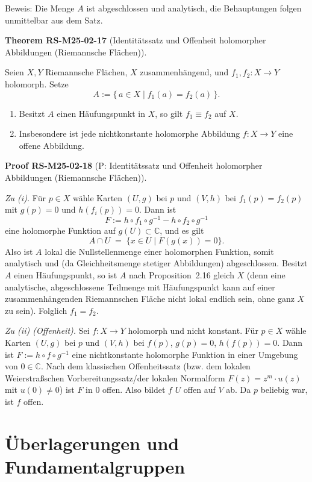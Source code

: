 \documentclass[10pt, letterpaper]{article}
\newcommand{\C}{\mathbb{C}}
\newcommand{\CustomHeading}[3]{%
  \par\medskip\noindent%
  \textbf{#1 #2} \textnormal{(#3)}.\enskip%
}
\newenvironment{THEO}[2]{\begin{unitbox}\CustomHeading{Theorem}{#1}{#2}}{\end{unitbox}}
\newenvironment{PROOF}[2]{\begin{unitbox}\CustomHeading{Proof}{#1}{#2}}{\end{unitbox}}
\begin{document}
Beweis: Die Menge $A$ ist abgeschlossen und analytisch, die Behauptungen folgen unmittelbar aus dem Satz.



\begin{THEO}{RS-M25-02-17}{Identitätssatz und Offenheit holomorpher Abbildungen (Riemannsche Flächen)}
Seien $X,Y$ Riemannsche Flächen, $X$ zusammenhängend, und $f_1,f_2:X\to Y$ holomorph. Setze
\[
A:=\{\,a\in X \mid f_1(a)=f_2(a)\,\}.
\]
\begin{enumerate}
\item[(i)] Besitzt $A$ einen Häufungspunkt in $X$, so gilt $f_1\equiv f_2$ auf $X$.
\item[(ii)] Insbesondere ist jede nichtkonstante holomorphe Abbildung $f:X\to Y$ eine offene Abbildung.
\end{enumerate}
\end{THEO}

\begin{PROOF}{RS-M25-02-18}{P: Identitätssatz und Offenheit holomorpher Abbildungen (Riemannsche Flächen)}
\emph{Zu (i).} Für $p\in X$ wähle Karten $(U,g)$ bei $p$ und $(V,h)$ bei $f_1(p)=f_2(p)$ mit $g(p)=0$ und $h(f_i(p))=0$. Dann ist
\[
F:=h\circ f_1\circ g^{-1}-h\circ f_2\circ g^{-1}
\]
eine holomorphe Funktion auf $g(U)\subset\C$, und es gilt
\[
A\cap U \;=\;\{x\in U \mid F(g(x))=0\}.
\]
Also ist $A$ lokal die Nullstellenmenge einer holomorphen Funktion, somit analytisch und (da Gleichheitsmenge stetiger Abbildungen) abgeschlossen.  
Besitzt $A$ einen Häufungspunkt, so ist $A$ nach Proposition~2.16 gleich $X$ (denn eine analytische, abgeschlossene Teilmenge mit Häufungspunkt kann auf einer zusammenhängenden Riemannschen Fläche nicht lokal endlich sein, ohne ganz $X$ zu sein). Folglich $f_1=f_2$.

\smallskip
\emph{Zu (ii) (Offenheit).} Sei $f:X\to Y$ holomorph und nicht konstant. Für $p\in X$ wähle Karten $(U,g)$ bei $p$ und $(V,h)$ bei $f(p)$, $g(p)=0$, $h(f(p))=0$. Dann ist $F:=h\circ f\circ g^{-1}$ eine nichtkonstante holomorphe Funktion in einer Umgebung von $0\in\C$. Nach dem klassischen Offenheitssatz (bzw. dem lokalen Weierstraßschen Vorbereitungssatz/der lokalen Normalform $F(z)=z^m\cdot u(z)$ mit $u(0)\neq 0$) ist $F$ in $0$ offen. Also bildet $f$ $U$ offen auf $V$ ab. Da $p$ beliebig war, ist $f$ offen.
\end{PROOF}





\pagebreak


\section {Überlagerungen und Fundamentalgruppen}
\end{document}
